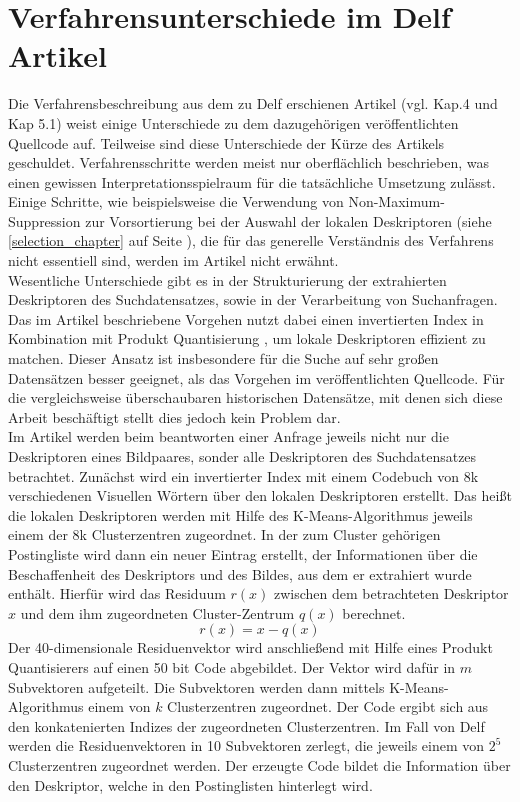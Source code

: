 \section{Verfahrensunterschiede im Delf Artikel}\label{pipeline_changes}
Die Verfahrensbeschreibung aus dem zu Delf erschienen Artikel (vgl. \cite{delf} Kap.4 und Kap 5.1) weist einige Unterschiede zu dem dazugehörigen veröffentlichten Quellcode auf. Teilweise sind diese Unterschiede der Kürze des Artikels geschuldet. Verfahrensschritte werden meist nur oberflächlich beschrieben, was einen gewissen Interpretationsspielraum für die tatsächliche Umsetzung zulässt. Einige Schritte, wie beispielsweise die Verwendung von  Non-Maximum-Suppression zur Vorsortierung bei der Auswahl der lokalen Deskriptoren (siehe \ref{selection_chapter} auf Seite \pageref{selection_chapter}), die für das generelle Verständnis des Verfahrens nicht essentiell sind, werden im Artikel nicht erwähnt.
\\
Wesentliche Unterschiede gibt es in der Strukturierung der extrahierten Deskriptoren des Suchdatensatzes, sowie in der Verarbeitung von Suchanfragen. Das im Artikel beschriebene Vorgehen nutzt dabei einen invertierten Index in Kombination mit Produkt Quantisierung \cite{pq}, um lokale Deskriptoren effizient zu matchen. Dieser Ansatz ist insbesondere für die Suche auf sehr großen Datensätzen besser geeignet, als das Vorgehen im veröffentlichten Quellcode. Für die vergleichsweise überschaubaren historischen Datensätze, mit denen sich diese Arbeit beschäftigt stellt dies jedoch kein Problem dar. 
\\
Im Artikel werden beim beantworten einer Anfrage jeweils nicht nur die Deskriptoren eines Bildpaares, sonder alle Deskriptoren des Suchdatensatzes betrachtet. Zunächst wird ein invertierter Index mit einem Codebuch von 8k verschiedenen Visuellen Wörtern über den lokalen Deskriptoren erstellt. Das heißt die lokalen Deskriptoren werden mit Hilfe des K-Means-Algorithmus\cite{k_means} jeweils einem der 8k Clusterzentren zugeordnet. In der zum Cluster gehörigen Postingliste wird dann ein neuer Eintrag erstellt, der Informationen über die Beschaffenheit des Deskriptors und des Bildes, aus dem er extrahiert wurde enthält. Hierfür wird das Residuum $r(x)$ zwischen dem betrachteten Deskriptor $x$ und dem ihm zugeordneten Cluster-Zentrum $q(x)$ berechnet.
\begin{equation}
r(x) = x - q(x)
\end{equation}
Der 40-dimensionale Residuenvektor wird anschließend mit Hilfe eines Produkt Quantisierers auf einen 50 bit Code abgebildet. Der Vektor wird dafür in $m$ Subvektoren aufgeteilt. Die Subvektoren werden dann mittels K-Means-Algorithmus einem von $k$ Clusterzentren zugeordnet. Der Code ergibt sich aus den konkatenierten Indizes der zugeordneten Clusterzentren. Im Fall von Delf werden die Residuenvektoren in 10 Subvektoren zerlegt, die jeweils einem von $2^5$ Clusterzentren zugeordnet werden. Der erzeugte Code bildet die Information über den Deskriptor, welche in den Postinglisten hinterlegt wird.
